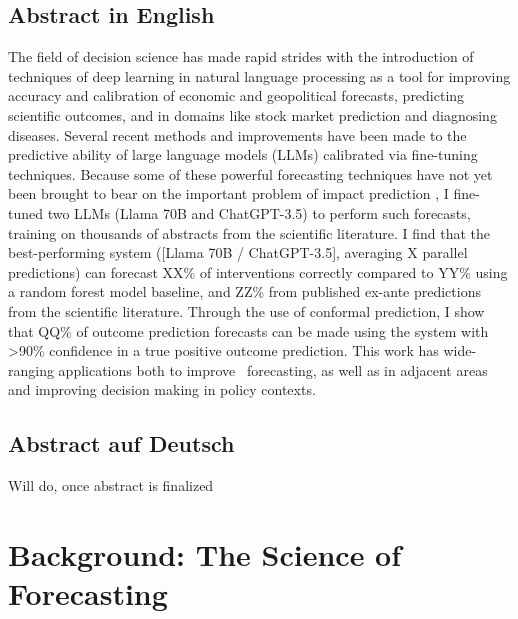 \documentclass[12pt,a4paper]{article}
\begin{document}
\subsection*{Abstract in English}
The field of decision science has made rapid strides with the introduction of techniques of deep learning in natural language processing as a tool for improving accuracy and calibration of economic and geopolitical forecasts, predicting scientific outcomes, and in domains like stock market prediction and diagnosing diseases. Several recent methods and improvements have been made to the predictive ability of large language models (LLMs) calibrated via fine-tuning techniques. Because some of these powerful forecasting techniques have not yet been brought to bear on the important problem of impact prediction \ABSTRACT, I fine-tuned two LLMs (Llama 70B and ChatGPT-3.5) to perform such forecasts, training on thousands of abstracts from the scientific literature. I find that the best-performing system ([Llama 70B / ChatGPT-3.5], averaging X parallel predictions) can forecast XX\% of interventions correctly compared to YY\% using a random forest model baseline, and ZZ\% from published ex-ante predictions from the scientific literature. Through the use of conformal prediction, I show that QQ\% of outcome prediction forecasts can be made using the system with >90\% confidence in a true positive outcome prediction. This work has wide-ranging applications both to improve \DOMAIN\ forecasting, as well as in adjacent areas and improving decision making in policy contexts.

\subsection*{Abstract auf Deutsch}
Will do, once abstract is finalized %
\clearpage

\setcounter{page}{1}
\tableofcontents
\clearpage

\setcounter{page}{1}





















\section{Background: The Science of Forecasting}
\end{document}
